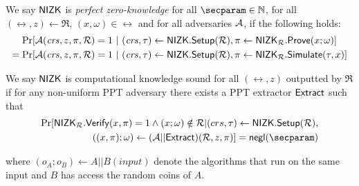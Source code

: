 \def\advV{\ensuremath{V^*}\xspace} %

\begin{definition}\label{def:nizk_zero_knowledge}
We say ${\mathsf{NIZK}}$ is {\em perfect zero-knowledge} for all $ \secparam \in \mathbb{N} $, for all $ (\rel,z) \leftarrow \mathfrak{R} $, $ (x,\omega) \in \rel $ and for all adversaries $ \mathcal{A} $, if the following holds:
\begin{align*}
	\Pr[& \mathcal{A}(\mathit{crs}, z, \pi,\mathcal{R}) = 1 \ | \ (\mathit{crs}, \tau) \leftarrow {\ensuremath{\mathsf{NIZK}}}.{\mathsf{Setup}} (\mathcal{R}),   \pi \leftarrow {\ensuremath{\mathsf{NIZK}}}_{\mathcal{R}}.{\mathsf{Prove}} (x;\omega)]\\
	=\Pr[& \mathcal{A}(\mathit{crs}, z, \pi,\mathcal{R}) = 1 \ | \ (\mathit{crs}, \tau) \leftarrow {\ensuremath{\mathsf{NIZK}}}.{\mathsf{Setup}} (\mathcal{R}),   \pi \leftarrow {\ensuremath{\mathsf{NIZK}}}_{\mathcal{R}}.{\mathsf{Simulate}} (\tau,x)]
\end{align*}

\end{definition}

\def\advP{\ensuremath{P^*}\xspace} %

\begin{definition}\label{def:nizk_knowledge_sound}
We say ${\mathsf{NIZK}}$ is {computational knowledge sound} for all $ (\rel,z)  $ outputted by $ \mathfrak{R} $ if
for any non-uniform PPT adversary \adv there exists a PPT extractor $ {\mathsf{Extract}} $
such that
\begin{align}
	\Pr[\NIZK_\rel.\Verify(x,\pi) = 1 \wedge  (x;\omega) \notin \rel | (crs,\tau) \leftarrow \NIZK.\Setup(\rel),\nonumber\\ ((x,\pi);\omega)\leftarrow (\adv||\Extract)(\rel,z,\pi)] =  \negl(\secparam) \nonumber
\end{align}
	
where $ (o_A;o_B)\leftarrow A||B(input) $ denote the algorithms that run on the same input and $ B $ has access the random coins of $ A $.
\end{definition}


%

